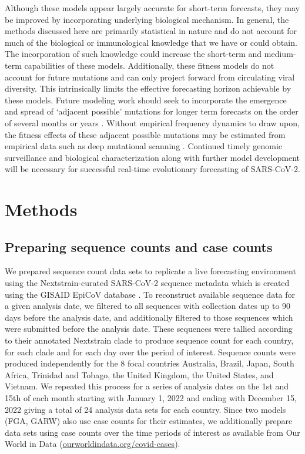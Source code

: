 \documentclass[10pt,letterpaper]{article}
\begin{document}
Although these models appear largely accurate for short-term forecasts, they may be improved by incorporating underlying biological mechanism.
In general, the methods discussed here are primarily statistical in nature and do not account for much of the biological or immunological knowledge that we have or could obtain.
The incorporation of such knowledge could increase the short-term and medium-term capabilities of these models.
Additionally, these fitness models do not account for future mutations and can only project forward from circulating viral diversity.
This intrinsically limits the effective forecasting horizon achievable by these models.
Future modeling work should seek to incorporate the emergence and spread of `adjacent possible' mutations for longer term forecasts on the order of several months or years \cite{kauffman1993origins}.
Without empirical frequency dynamics to draw upon, the fitness effects of these adjacent possible mutations may be estimated from empirical data such as deep mutational scanning \cite{cao2022ba, greaney2022antibody, dadonaite2023full}.
Continued timely genomic surveillance and biological characterization along with further model development will be necessary for successful real-time evolutionary forecasting of SARS-CoV-2.

\section*{Methods}

\subsection*{Preparing sequence counts and case counts}

We prepared sequence count data sets to replicate a live forecasting environment using the Nextstrain-curated SARS-CoV-2 sequence metadata \cite{hadfield2018nextstrain} which is created using the GISAID EpiCoV database \cite{khare2021gisaid}.
To reconstruct available sequence data for a given analysis date, we filtered to all sequences with collection dates up to 90 days before the analysis date, and additionally filtered to those sequences which were submitted before the analysis date.
These sequences were tallied according to their annotated Nextstrain clade to produce sequence count for each country, for each clade and for each day over the period of interest.
Sequence counts were produced independently for the 8 focal countries Australia, Brazil, Japan, South Africa, Trinidad and Tobago, the United Kingdom, the United States, and Vietnam.
We repeated this process for a series of analysis dates on the 1st and 15th of each month starting with January 1, 2022 and ending with December 15, 2022 giving a total of 24 analysis data sets for each country.
Since two models (FGA, GARW) also use case counts for their estimates, we additionally prepare data sets using case counts over the time periods of interest as available from Our World in Data (\href{https://ourworldindata.org/covid-cases}{ourworldindata.org/covid-cases}).
\end{document}

